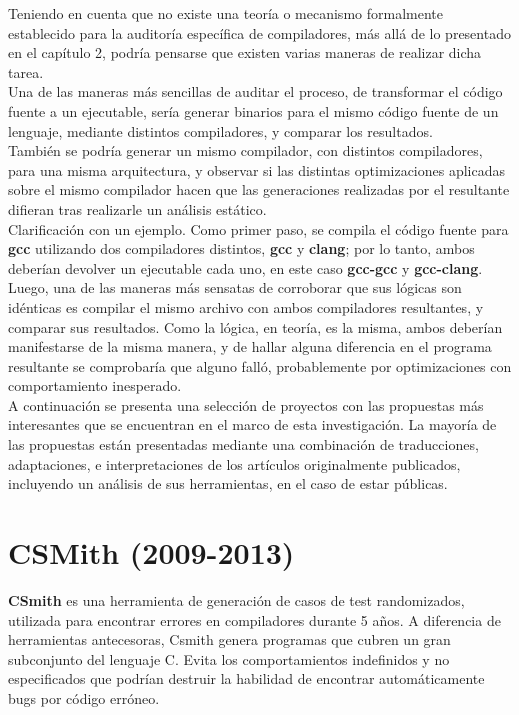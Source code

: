 Teniendo en cuenta que no existe una teoría o mecanismo formalmente establecido para la auditoría específica de compiladores, más allá de lo presentado en el capítulo 2, podría pensarse que existen varias maneras de realizar dicha tarea.\\

Una de las maneras más sencillas de auditar el proceso, de transformar el código fuente a un ejecutable, sería generar binarios para el mismo código fuente de un lenguaje, mediante distintos compiladores, y comparar los resultados.\\

También se podría generar un mismo compilador, con distintos compiladores, para una misma arquitectura, y observar si las distintas optimizaciones aplicadas sobre el mismo compilador hacen que las generaciones realizadas por el resultante difieran tras realizarle un análisis estático.\\

Clarificación con un ejemplo. Como primer paso, se compila el código fuente para \textbf{gcc} utilizando dos compiladores distintos, \textbf{gcc} y \textbf{clang}; por lo tanto, ambos deberían devolver un ejecutable cada uno, en este caso \textbf{gcc-gcc} y \textbf{gcc-clang}. Luego, una de las maneras más sensatas de corroborar que sus lógicas son idénticas es compilar el mismo archivo con ambos compiladores resultantes, y comparar sus resultados. Como la lógica, en teoría, es la misma, ambos deberían manifestarse de la misma manera, y de hallar alguna diferencia en el programa resultante se comprobaría que alguno falló, probablemente por optimizaciones con comportamiento inesperado.\\

A continuación se presenta una selección de proyectos con las propuestas más interesantes que se encuentran en el marco de esta investigación. La mayoría de las propuestas están presentadas mediante una combinación de traducciones, adaptaciones, e interpretaciones de los artículos originalmente publicados, incluyendo un análisis de sus herramientas, en el caso de estar públicas.

\section{CSMith (2009-2013)}
\textbf{CSmith} es una herramienta de generación de casos de test randomizados, utilizada para encontrar errores en compiladores durante 5 años. A diferencia de herramientas antecesoras, Csmith genera programas que cubren un gran subconjunto del lenguaje C. Evita los comportamientos indefinidos y no especificados que podrían destruir la habilidad de encontrar automáticamente bugs por código erróneo. \\

